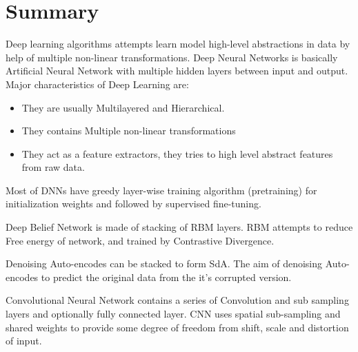 \section{Summary}
Deep learning algorithms attempts learn model high-level abstractions in data by help of multiple non-linear transformations. Deep Neural Networks is basically Artificial Neural Network with multiple hidden layers between input and output. Major characteristics of Deep Learning are:
\begin{itemize}
\item They are usually Multilayered and Hierarchical.
\item They contains Multiple non-linear transformations 
\item They act as a feature extractors, they tries to high level abstract features from raw data.
\end{itemize}

Most of DNNs have greedy layer-wise training algorithm (pretraining) for initialization weights and followed by supervised fine-tuning.
 
Deep Belief Network is made of stacking of RBM layers. RBM attempts to reduce Free energy of network, and trained by Contrastive Divergence.
 
Denoising Auto-encodes can be stacked to form SdA. The aim of denoising Auto-encodes to predict the original data from the it's corrupted version.

Convolutional Neural Network contains a series of Convolution and sub sampling layers and optionally fully connected layer. CNN uses spatial sub-sampling and shared weights to provide some degree of freedom from shift, scale and distortion of input.
